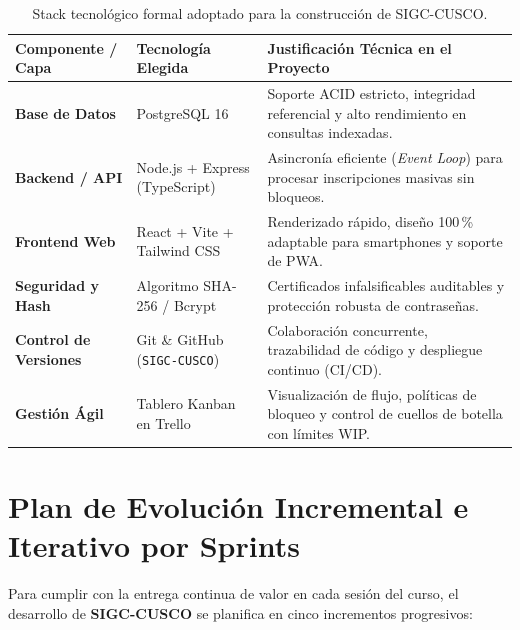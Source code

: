 \documentclass[11pt,a4paper]{article}
\begin{document}
\begin{table}[H]
\centering
\small
\renewcommand{\arraystretch}{1.2}
\begin{tabularx}{\textwidth}{P{3.0cm}P{4.2cm}Y}
\toprule
\textbf{Componente / Capa} & \textbf{Tecnología Elegida} & \textbf{Justificación Técnica en el Proyecto} \\
\midrule
\textbf{Base de Datos} & PostgreSQL 16 & Soporte ACID estricto, integridad referencial y alto rendimiento en consultas indexadas. \\
\midrule
\textbf{Backend / API} & Node.js + Express (TypeScript) & Asincronía eficiente (\textit{Event Loop}) para procesar inscripciones masivas sin bloqueos. \\
\midrule
\textbf{Frontend Web} & React + Vite + Tailwind CSS & Renderizado rápido, diseño 100\,\% adaptable para smartphones y soporte de PWA. \\
\midrule
\textbf{Seguridad y Hash} & Algoritmo SHA-256 / Bcrypt & Certificados infalsificables auditables y protección robusta de contraseñas. \\
\midrule
\textbf{Control de Versiones} & Git \& GitHub (\texttt{SIGC-CUSCO}) & Colaboración concurrente, trazabilidad de código y despliegue continuo (CI/CD). \\
\midrule
\textbf{Gestión Ágil} & Tablero Kanban en Trello & Visualización de flujo, políticas de bloqueo y control de cuellos de botella con límites WIP. \\
\bottomrule
\end{tabularx}
\caption{Stack tecnológico formal adoptado para la construcción de SIGC-CUSCO.}
\label{tab:stack}
\end{table}

\section{Plan de Evolución Incremental e Iterativo por Sprints}

Para cumplir con la entrega continua de valor en cada sesión del curso, el desarrollo de \textbf{SIGC-CUSCO} se planifica en cinco incrementos progresivos:
\end{document}
